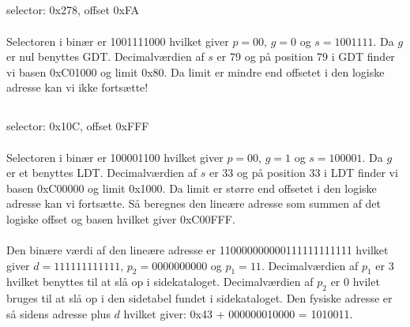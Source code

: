 \documentclass[titlepage]{article}
\begin{document}
  \subsection{}
    selector: 0x278, offset 0xFA
    \\\\
    Selectoren i binær er 1001111000 hvilket giver $p = 00$, $g = 0$ og $s = 1001111$.
    Da $g$ er nul benyttes GDT.
    Decimalværdien af $s$ er 79 og på position 79 i GDT finder vi basen 0xC01000 og limit 0x80.
    Da limit er mindre end offsetet i den logiske adresse kan vi ikke fortsætte!
    
  \subsection{}
    selector: 0x10C, offset 0xFFF
    \\\\
    Selectoren i binær er 100001100 hvilket giver $p = 00$, $g = 1$ og $s = 100001$.
    Da $g$ er et benyttes LDT.
    Decimalværdien af $s$ er 33 og på position 33 i LDT finder vi basen 0xC00000 og limit 0x1000.
    Da limit er større end offsetet i den logiske adresse kan vi fortsætte.
    Så beregnes den lineære adresse som summen af det logiske offset og basen hvilket giver 0xC00FFF.
    \\\\
    Den binære værdi af den lineære adresse er 110000000000111111111111 hvilket giver $d = 111111111111$, $p_2 = 0000000000$ og $p_1 = 11$.
    Decimalværdien af $p_1$ er 3 hvilket benyttes til at slå op i sidekataloget.
    Decimalværdien af $p_2$ er 0 hvilet bruges til at slå op i den sidetabel fundet i sidekataloget.
    Den fysiske adresse er så sidens adresse plus $d$ hvilket giver: 0x43 + 000000010000 = 1010011.
\end{document}
